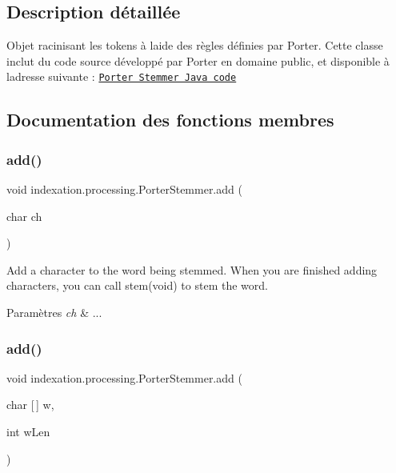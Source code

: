 \subsection{Description détaillée}
Objet racinisant les tokens à l\textquotesingle{}aide des règles définies par Porter. Cette classe inclut du code source développé par Porter en domaine public, et disponible à l\textquotesingle{}adresse suivante \+: \href{https://tartarus.org/martin/PorterStemmer/java.txt}{\tt Porter Stemmer Java code} 

\subsection{Documentation des fonctions membres}
\mbox{\label{classindexation_1_1processing_1_1PorterStemmer_a707458b373324b9949c3e81b1f35161f}} 
\subsubsection{\texorpdfstring{add()}{add()}\hspace{0.1cm}{\footnotesize\ttfamily [1/2]}}
{\footnotesize\ttfamily void indexation.\+processing.\+Porter\+Stemmer.\+add (\begin{DoxyParamCaption}\item[{char}]{ch }\end{DoxyParamCaption})}

Add a character to the word being stemmed. When you are finished adding characters, you can call stem(void) to stem the word.


\begin{DoxyParams}{Paramètres}
{\em ch} & ... \\
\hline
\end{DoxyParams}
\mbox{\label{classindexation_1_1processing_1_1PorterStemmer_acbf12a93895c42d6387c3d33cbccdfe0}} 
\subsubsection{\texorpdfstring{add()}{add()}\hspace{0.1cm}{\footnotesize\ttfamily [2/2]}}
{\footnotesize\ttfamily void indexation.\+processing.\+Porter\+Stemmer.\+add (\begin{DoxyParamCaption}\item[{char \mbox{[}$\,$\mbox{]}}]{w,  }\item[{int}]{w\+Len }\end{DoxyParamCaption})}

